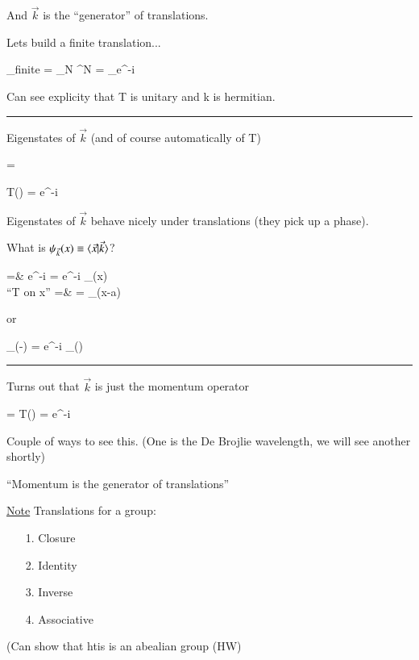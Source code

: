 {And $\vec{k}$ is the ``generator'' of translations.


Lets build a finite translation...

\be
{}_{finite} = \lim\limits_{N \to \infty}^N = _{e^{-i\cdot{}}}
\ee


Can see explicity that T is unitary and k is hermitian. 


\noindent\rule{\textwidth}{1pt}

Eigenstates of $\vec{k}$ (and of course automatically of T)

\be
{} =  
\ee


\be
T() = e^{-i\cdot{}} 
\ee

Eigenstates of $\vec{k}$ behave nicely under translations (they pick up a phase).

What is $\psi_{\vec{k}}(x) \equiv \braket{\vec{x}|\vec{k}} $?

\bea
{} =& e^{-i\cdot{}}  = e^{-i\cdot{}} \psi_{}(x)\\
\textrm{``T on x''}  =&  = \psi_{}(x-a)\\
\eea

or

\be
\psi_{}(-) = e^{-i\cdot{}} \psi_{}()
\ee

\noindent\rule{\textwidth}{1pt}

Turns out that $\vec{k}$ is just the momentum operator 

\begin{tcolorbox}
\be
{} = \hbar {}    T() = e^{-i}
\ee
\end{tcolorbox}


Couple of ways to see this. (One is the De Brojlie wavelength, we will see another shortly)


``Momentum is the generator of translations''

\underline{Note} Translations for a group: 
\begin{itemize}
\item[1.] Closure
\item[2.] Identity
\item[3.] Inverse
\item[4.] Associative
\end{itemize}
(Can show that htis is an abealian group (HW)

}
